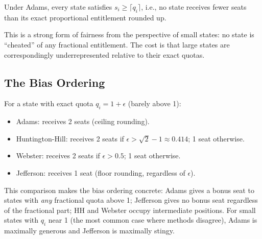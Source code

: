 \begin{corollary}
  Under Adams, every state satisfies $s_i \geq \lceil q_i \rceil$,
  i.e., no state receives fewer seats than its exact proportional
  entitlement rounded up.
\end{corollary}

This is a strong form of fairness from the perspective of small states:
no state is ``cheated'' of any fractional entitlement.
The cost is that large states are correspondingly underrepresented
relative to their exact quotas.

\subsection{The Bias Ordering}

For a state with exact quota $q_i = 1 + \epsilon$ (barely above 1):
\begin{itemize}
  \item Adams: receives 2 seats (ceiling rounding).
  \item Huntington-Hill: receives 2 seats if $\epsilon > \sqrt{2} - 1
    \approx 0.414$; 1 seat otherwise.
  \item Webster: receives 2 seats if $\epsilon > 0.5$; 1 seat otherwise.
  \item Jefferson: receives 1 seat (floor rounding, regardless of $\epsilon$).
\end{itemize}
This comparison makes the bias ordering concrete:
Adams gives a bonus seat to states with \emph{any} fractional quota
above 1; Jefferson gives no bonus seat regardless of the fractional part;
HH and Webster occupy intermediate positions.
For small states with $q_i$ near 1 (the most common case where methods
disagree), Adams is maximally generous and Jefferson is maximally
stingy.
